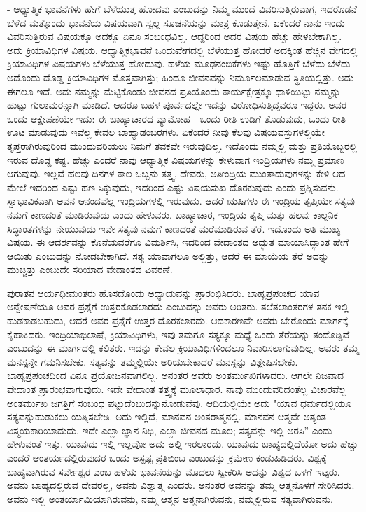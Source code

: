 - ಆಧ್ಯಾತ್ಮಿಕ ಭಾವನೆಗಳು ಹೇಗೆ ಬೆಳೆಯುತ್ತ ಹೋದವು ಎಂಬುದನ್ನು ನಿಮ್ಮ ಮುಂದೆ ವಿವರಿಸುತ್ತಿರುವಾಗ, ಇದರೊಡನೆ ಬೆಳೆದ ಮತ್ತೊಂದು ಭಾವನೆಯ ವಿಷಯವಾಗಿ ಸ್ವಲ್ಪ ಸೂಚನೆಯನ್ನು ಮಾತ್ರ ಕೊಡುತ್ತೇನೆ. ಏಕೆಂದರೆ ನಾನು ಇಂದು ವಿವರಿಸುತ್ತಿರುವ ವಿಷಯಕ್ಕೂ ಅದಕ್ಕೂ ಏನೂ ಸಂಬಂಧವಿಲ್ಲ. ಆದ್ದರಿಂದ ಅದರ ವಿಷಯ ಹೆಚ್ಚು ಹೇಳಬೇಕಾಗಿಲ್ಲ. ಅದು ಕ್ರಿಯಾವಿಧಿಗಳ ವಿಷಯ. ಆಧ್ಯಾತ್ಮಿಕಭಾವನೆ ಒಂದು\break ವೇಗದಲ್ಲಿ ಬೆಳೆಯುತ್ತ ಹೋದರೆ ಅದಕ್ಕಿಂತ ಹೆಚ್ಚಿನ ವೇಗದಲ್ಲಿ ಕ್ರಿಯಾವಿಧಿಗಳ ವಿಷಯಗಳು ಬೆಳೆಯುತ್ತ ಹೋದುವು. ಹಳೆಯ ಮೂಢನಂಬಿಕೆಗಳು ಇಷ್ಟು ಹೊತ್ತಿಗೆ ಬೆಳೆದು ಬೆಳೆದು ಅದೊಂದು ದೊಡ್ಡ ಕ್ರಿಯಾವಿಧಿಗಳ ಮೊತ್ತವಾಗಿತ್ತು; ಹಿಂದೂ ಜೀವನವನ್ನು ನಿರ್ಮೂಲಮಾಡುವ ಸ್ಥಿತಿಯಲ್ಲಿತ್ತು. ಅದು ಈಗಲೂ ಇದೆ. ಅದು ನಮ್ಮನ್ನು ಮೆಟ್ಟಿಕೊಂಡು ಜೀವನದ ಪ್ರತಿಯೊಂದು ಕಾರ್ಯಕ್ಷೇತ್ರಕ್ಕೂ ಧಾಳಿಯಿಟ್ಟು ನಮ್ಮನ್ನು ಹುಟ್ಟು ಗುಲಾಮರನ್ನಾಗಿ ಮಾಡಿದೆ. ಆದರೂ ಬಹಳ ಪೂರ್ವದಲ್ಲೇ ಇದನ್ನು ವಿರೋಧಿಸುತ್ತಿದ್ದವರೂ ಇದ್ದರು. ಅವರ ಒಂದು ಆಕ್ಷೇಪಣೆಯೇ ಇದು: ಈ ಬಾಹ್ಯಾಚಾರದ ವ್ಯಾಮೋಹ - ಒಂದು ರೀತಿ ಉಡಿಗೆ ತೊಡುವುದು, ಒಂದು ರೀತಿ ಊಟ ಮಾಡುವುದು ಇವೆಲ್ಲ ಕೇವಲ ಬಾಹ್ಯಾಡಂಬರಗಳು. ಏಕೆಂದರೆ ನೀವು ಕೆಲವು ವಿಷಯವಸ್ತುಗಳಲ್ಲಿಯೇ ತೃಪ್ತರಾಗಿರುವುರಿಂದ ಮುಂದುವರಿಯಲು ನಿಮಗೆ ತವಕವೇ ಇರುವುದಿಲ್ಲ. ಇದೊಂದು ನಮ್ಮಲ್ಲಿ ಮತ್ತು ಪ್ರತಿಯೊಬ್ಬರಲ್ಲಿ ಇರುವ ದೊಡ್ಡ ಕಷ್ಟ. ಹೆಚ್ಚು ಎಂದರೆ ನಾವು ಆಧ್ಯಾತ್ಮಿಕ ವಿಷಯಗಳನ್ನು ಕೇಳುವಾಗ ಇಂದ್ರಿಯಗಳು ನಮ್ಮ ಪ್ರಮಾಣ ಆಗುವುವು. ಇಲ್ಲವೆ ಹಲವು ದಿನಗಳ ಕಾಲ ಒಬ್ಬನು ತತ್ತ್ವ, ದೇವರು, ಅತೀಂದ್ರಿಯ ಮುಂತಾದುವುಗಳನ್ನು ಕೇಳಿ ಆದ ಮೇಲೆ ಇದರಿಂದ ಎಷ್ಟು ಹಣ ಸಿಕ್ಕುವುದು, ಇದರಿಂದ ಎಷ್ಟು ವಿಷಯಸುಖ ದೊರಕುವುದು ಎಂದು ಪ್ರಶ್ನಿಸುವನು. ಸ್ವಾಭಾವಿಕವಾಗಿ ಅವನ ಆನಂದವೆಲ್ಲ ಇಂದ್ರಿಯಗಳಲ್ಲಿ ಇರುವುದು. ಆದರೆ ಋಷಿಗಳು ಈ ಇಂದ್ರಿಯ ತೃಪ್ತಿಯೇ ಸತ್ಯವು ನಮಗೆ ಕಾಣದಂತೆ ಮಾಡಿರುವುದು ಎಂದು ಹೇಳುವರು. ಬಾಹ್ಯಾಚಾರ, ಇಂದ್ರಿಯ ತೃಪ್ತಿ ಮತ್ತು ಹಲವು ಕಾಲ್ಪನಿಕ ಸಿದ್ಧಾಂತಗಳನ್ನು ನೇಯುವುದು ಇವೇ ಸತ್ಯವು ನಮಗೆ ಕಾಣದಂತೆ ಮರೆಮಾಡಿರುವ ತೆರೆ. ಇದೊಂದು ಅತಿ ಮುಖ್ಯ ವಿಷಯ. ಈ ಆದರ್ಶವನ್ನು ಕೊನೆಯವರೆಗೂ ವಿಮರ್ಶಿಸಿ, ಇದರಿಂದ ವೇದಾಂತದ ಅದ್ಭುತ ಮಾಯಾಸಿದ್ಧಾಂತ ಹೇಗೆ ಆಯಿತು ಎಂಬುದನ್ನು ನೋಡಬೇಕಾಗಿದೆ. ಸತ್ಯ ಯಾವಾಗಲೂ ಅಲ್ಲಿತ್ತು, ಆದರೆ ಈ ಮಾಯೆಯ ತೆರೆ ಅದನ್ನು ಮುಚ್ಚಿತ್ತು ಎಂಬುದೇ ಸರಿಯಾದ ವೇದಾಂತದ ವಿವರಣೆ.

ಪುರಾತನ ಆರ್ಯಧೀಮಂತರು ಹೊಸದೊಂದು ಅಧ್ಯಾಯವನ್ನು ಪ್ರಾರಂಭಿಸಿದರು. ಬಾಹ್ಯಪ್ರಪಂಚದ ಯಾವ ಅನ್ವೇಷಣೆಯೂ ಅವರ ಪ್ರಶ್ನೆಗೆ ಉತ್ತರ\break ಕೊಡಲಾರದು ಎಂಬುದನ್ನು ಅವರು ಅರಿತರು. ತಲೆತಲಾಂತರಗಳ ತನಕ ಇಲ್ಲಿ ಹುಡಕಾಡಬಹುದು, ಆದರೆ ಅವರ ಪ್ರಶ್ನೆಗೆ ಉತ್ತರ ದೊರಕಲಾರದು. ಆದಕಾರಣವೇ ಅವರು ಬೇರೊಂದು ಮಾರ್ಗಕ್ಕೆ ಕೈಹಾಕಿದರು. ಇಂದ್ರಿಯಾಭಿಲಾಷೆ, ಕ್ರಿಯಾವಿಧಿಗಳು, ಇವು ತಮಗೂ ಸತ್ಯಕ್ಕೂ ಮಧ್ಯೆ ಒಂದು ತೆರೆಯನ್ನು ತಂದೊಡ್ಡಿವೆ ಎಂಬುದನ್ನು ಈ ಮಾರ್ಗದಲ್ಲಿ ಕಲಿತರು. ಇದನ್ನು ಕೇವಲ ಕ್ರಿಯಾವಿಧಿಗಳಿಂದಲೂ ನಿವಾರಿಸಲಾಗುವುದಿಲ್ಲ. ಅವರು ತಮ್ಮ ಮನಸ್ಸನ್ನೇ ಗಮನಿಸಬೇಕು. ಸತ್ಯವನ್ನು ತಮ್ಮಲ್ಲಿಯೇ ಅರಿಯಬೇಕಾದರೆ ಮನಸ್ಸನ್ನು ವಿಶ್ಲೇಷಿಸಬೇಕು. ಬಾಹ್ಯಪ್ರಪಂಚದಿಂದ ಏನೂ ಪ್ರಯೋಜನವಾಗಲಿಲ್ಲ. ಅನಂತರ ಅವರು ಅಂತರ್ಮುಖಿಗಳಾದರು. ಆಗಲೇ ನಿಜವಾದ ವೇದಾಂತ ಪ್ರಾರಂಭವಾಗುವುದು. ಇದೇ ವೇದಾಂತ ತತ್ತ್ವಕ್ಕೆ ಮೂಲಾಧಾರ. ನಾವು ಮುಂದುವರಿದಂತೆಲ್ಲ ವಿಚಾರವೆಲ್ಲ ಅಂತರ್ಮುಖ ಜಗತ್ತಿಗೆ ಸಂಬಂಧ ಪಟ್ಟುದೆಂಬುದನ್ನು\break ನೋಡುವೆವು. ಆದಿಯಲ್ಲಿಯೇ ಅದು "ಯಾವ ಧರ್ಮದಲ್ಲಿಯೂ ಸತ್ಯವನ್ನು\break ಹುಡುಕಲು ಯತ್ನಿಸಬೇಡಿ. ಅದು ಇಲ್ಲಿದೆ, ಮಾನವನ ಅಂತರಾತ್ಮನಲ್ಲಿ. ಮಾನವನ ಆತ್ಮವೇ ಅತ್ಯಂತ ವಿಸ್ಮಯಕಾರಿಯಾದುದು, ಇದೇ ಎಲ್ಲಾ ಜ್ಞಾನ ನಿಧಿ, ಎಲ್ಲಾ ಜೀವನದ ಮೂಲ; ಸತ್ಯವನ್ನು ಇಲ್ಲಿ ಅರಸಿ'' ಎಂದು ಹೇಳುವಂತೆ ಇತ್ತು. ಯಾವುದು ಇಲ್ಲಿ ಇಲ್ಲವೋ ಅದು ಅಲ್ಲಿ ಇರಲಾರದು. ಯಾವುದು ಬಾಹ್ಯದಲ್ಲಿದೆಯೋ ಅದು ಹೆಚ್ಚು ಎಂದರೆ ಆಂತರ್ಯದಲ್ಲಿರುವುದರ ಒಂದು ಅಸ್ಪಷ್ಟ ಪ್ರತಿಬಿಂಬ ಎಂಬುದನ್ನು ಕ್ರಮೇಣ ಕಂಡುಹಿಡಿದರು. ವಿಶ್ವಕ್ಕೆ ಬಾಹ್ಯವಾಗಿರುವ ಸರ್ವೇಶ್ವರ ಎಂಬ ಹಳೆಯ ಭಾವನೆಯನ್ನು ಮೊದಲು ಸ್ವೀಕರಿಸಿ ಅದನ್ನು ವಿಶ್ವದ ಒಳಗೆ ಇಟ್ಟರು. ಅವನು ಬಾಹ್ಯದಲ್ಲಿರುವ ದೇವರಲ್ಲ, ಅವನು ವಿಶ್ವಾತ್ಮ ಎಂದರು. ಅನಂತರ ಅವನನ್ನು ತಮ್ಮ ಆತ್ಮನೊಳಗೆ ಸೇರಿಸಿದರು. ಅವನು ಇಲ್ಲಿ ಅಂತರ್ಯಾಮಿಯಾಗಿರುವನು, ನಮ್ಮ ಆತ್ಮನ ಆತ್ಮನಾಗಿರುವನು, ನಮ್ಮಲ್ಲಿರುವ ಸತ್ಯವಾಗಿರುವನು.

